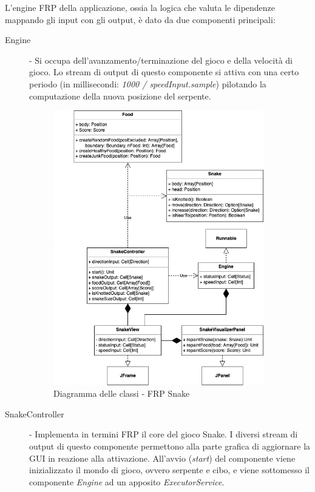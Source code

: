 \documentclass[../main.tex]{subfiles}
\begin{document}
L'engine FRP della applicazione, ossia la logica che valuta le dipendenze mappando gli input con gli output, è dato da due componenti principali:
\begin{description}
  \item[Engine] - Si occupa dell'avanzamento/terminazione del gioco e della velocità di gioco. Lo stream di output di questo componente si attiva con una certo periodo (in millisecondi: \textit{1000 / speedInput.sample}) pilotando la computazione della nuova posizione del serpente.
  \begin{figure}[H]
\centering
\includegraphics[width=0.9\textwidth]{img/frp-scala-Page-6.drawio.png}
\caption{Diagramma delle classi - FRP Snake}
\end{figure}
  \item[SnakeController] - Implementa in termini FRP il core del gioco Snake. I diversi stream di output di questo componente permettono alla parte grafica di aggiornare la GUI in reazione alla attivazione. All'avvio (\textit{start}) del componente viene inizializzato il mondo di gioco, ovvero serpente e cibo, e viene sottomesso il componente \textit{Engine} ad un apposito \textit{ExecutorService}.
\end{description}
\end{document}
